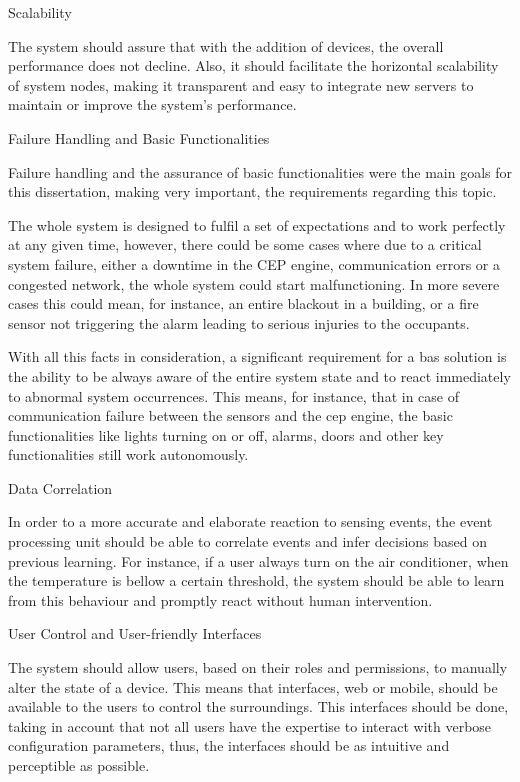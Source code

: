 \begin{Paragraph}{Scalability}

The system should assure that with the addition of devices, the overall performance does not decline. Also, it should facilitate the horizontal scalability of system nodes, making it transparent and easy to integrate new servers to maintain or improve the system's performance.

\end{Paragraph}

\begin{Paragraph}{Failure Handling and Basic Functionalities}
	
Failure handling and the assurance of basic functionalities were the main goals for this dissertation, making very important, the requirements regarding this topic.

The whole system is designed to fulfil a set of expectations and to work perfectly at any given time, however, there could be some cases where due to a critical system failure, either a downtime in the CEP engine, communication errors or a congested network, the whole system could start malfunctioning. In more severe cases this could mean, for instance, an entire blackout in a building, or a fire sensor not triggering the alarm leading to serious injuries to the occupants.

With all this facts in consideration, a significant requirement for a \ac{bas} solution is the ability to be always aware of the entire system state and to react immediately to abnormal system occurrences. This means, for instance, that in case of communication failure between the sensors and the \ac{cep} engine, the basic functionalities like lights turning on or off, alarms, doors and other key functionalities still work autonomously.
\end{Paragraph}

\begin{Paragraph}{Data Correlation}

In order to a more accurate and elaborate reaction to sensing events, the event processing unit should be able to correlate events and infer decisions based on previous learning. For instance, if a user always turn on the air conditioner, when the temperature is bellow a certain threshold, the system should be able to learn from this behaviour and promptly react without human intervention.

\end{Paragraph}

\begin{Paragraph}{User Control and User-friendly Interfaces}
	
The system should allow users, based on their roles and permissions, to manually alter the state of a device. This means that interfaces, web or mobile, should be available to the users to control the surroundings. This interfaces should be done, taking in account that not all users have the expertise to interact with verbose configuration parameters, thus, the interfaces should be as intuitive and perceptible as possible.
	
\end{Paragraph}


